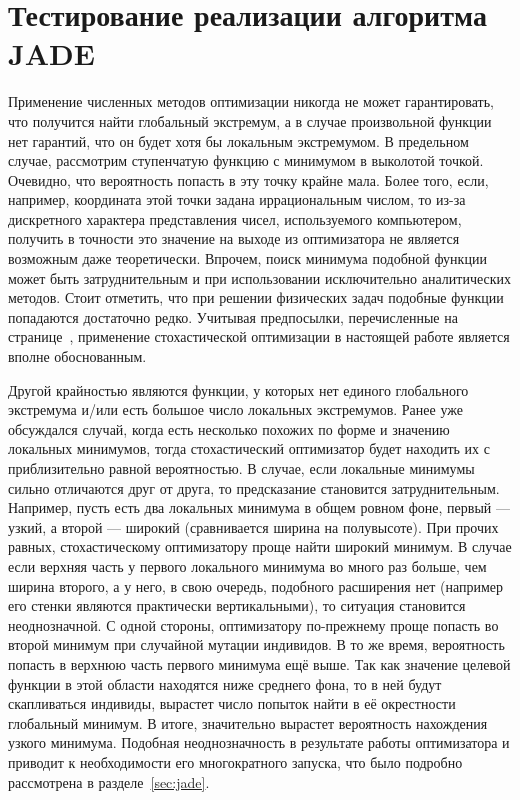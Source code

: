 \section{Тестирование реализации алгоритма JADE}
\label{sec:test-jade}
Применение численных методов оптимизации никогда не может
гарантировать, что получится найти глобальный экстремум, а в случае
произвольной функции нет гарантий, что он будет  хотя бы
локальным экстремумом.  В предельном случае, рассмотрим ступенчатую
функцию с минимумом в выколотой точкой.  Очевидно, что вероятность
попасть в эту точку крайне мала.  Более того, если, например,
координата этой точки задана иррациональным числом, то из-за
дискретного характера представления чисел, используемого компьютером, получить в
точности это значение на выходе из оптимизатора не является возможным
даже теоретически.  Впрочем, поиск минимума подобной функции может
быть затруднительным и при использовании исключительно аналитических
методов.  Стоит отметить, что при решении физических задач подобные
функции попадаются достаточно редко.  Учитывая предпосылки,
перечисленные на странице~\pageref{ref:why-jade}, применение
стохастической оптимизации в настоящей работе является вполне
обоснованным.

Другой крайностью являются функции, у которых нет единого глобального
экстремума и/или есть большое число локальных экстремумов.  Ранее уже
обсуждался случай, когда есть несколько похожих по форме и значению
локальных минимумов, тогда стохастический оптимизатор будет находить
их с приблизительно равной вероятностью.  В случае, если локальные
минимумы сильно отличаются друг от друга, то предсказание становится
затруднительным.  Например, пусть есть два локальных минимума в общем
ровном фоне, первый --- узкий, а второй --- широкий (сравнивается ширина
на полувысоте). При прочих равных, стохастическому оптимизатору проще
найти широкий минимум. В случае если верхняя часть у первого
локального минимума во много раз больше, чем ширина второго, а у
него, в свою очередь, подобного расширения нет (например его стенки
являются практически вертикальными), то ситуация становится
неоднозначной.  С одной стороны, оптимизатору по-прежнему проще
попасть во второй минимум при случайной мутации индивидов. В то же
время, вероятность попасть в верхнюю часть первого минимума ещё
выше. Так как значение целевой функции в этой области находятся ниже
среднего фона, то в ней будут скапливаться индивиды, вырастет число
попыток найти в её окрестности глобальный минимум.  В итоге,
значительно вырастет вероятность нахождения узкого минимума.  Подобная
неоднозначность в результате работы оптимизатора и приводит к
необходимости его многократного запуска, что было подробно рассмотрена
в разделе~\ref{sec:jade}.

